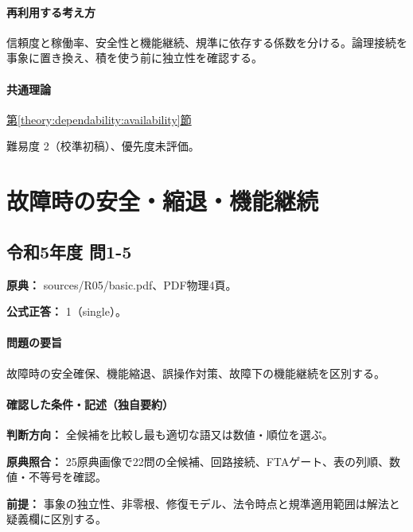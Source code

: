 \paragraph{再利用する考え方} 信頼度と稼働率、安全性と機能継続、規準に依存する係数を分ける。論理接続を事象に置き換え、積を使う前に独立性を確認する。

\paragraph{共通理論} \hyperref[theory:dependability:availability]{第\ref*{theory:dependability:availability}節}

\par 難易度 2（校準初稿）、優先度未評価。

\section{故障時の安全・縮退・機能継続}

\subsection{令和5年度 問1-5}
\label{q:r05-reg-basic-1-5}

\noindent\textbf{原典：} sources/R05/basic.pdf、PDF物理4頁。

\textbf{公式正答：} 1（single）。

\paragraph{問題の要旨} 故障時の安全確保、機能縮退、誤操作対策、故障下の機能継続を区別する。

\paragraph{確認した条件・記述（独自要約）}\mbox{}\par

\noindent\textbf{判断方向：} 全候補を比較し最も適切な語又は数値・順位を選ぶ。\par

\noindent\textbf{原典照合：} 25原典画像で22問の全候補、回路接続、FTAゲート、表の列順、数値・不等号を確認。\par

\noindent\textbf{前提：} 事象の独立性、非零根、修復モデル、法令時点と規準適用範囲は解法と疑義欄に区別する。\par

